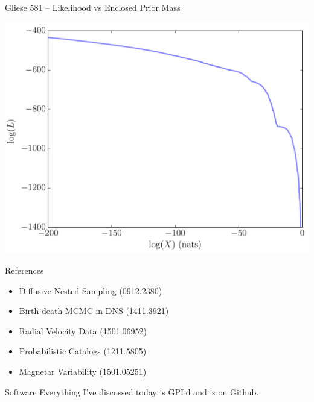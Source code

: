 \begin{frame}[t]{Gliese 581 -- Likelihood vs Enclosed Prior Mass}
\begin{center}
\includegraphics[scale=0.4]{ExoplanetFigures/logl.pdf}
\end{center}
\end{frame}


\begin{frame}[t]{References}
\begin{itemize}
\item Diffusive Nested Sampling (0912.2380)
\item Birth-death MCMC in DNS (1411.3921)
\item Radial Velocity Data (1501.06952)
\item Probabilistic Catalogs (1211.5805)
\item Magnetar Variability (1501.05251)
\end{itemize}
\end{frame}

\begin{frame}[t]{Software}
Everything I've discussed today is GPLd and is on Github.
\end{frame}

